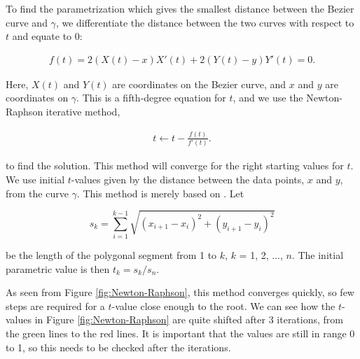 \documentclass[10pt]{article}
\begin{document}
To find the parametrization which gives the smallest distance between the Bezier curve and $\gamma$, we differentiate the distance between the two curves with respect to $t$ and equate to 0:

\begin{align}
f(t) =  2(X(t)-x)X'(t) + 2(Y(t)-y)Y'(t) = 0.
\end{align}

Here, $X(t)$ and $Y(t)$ are coordinates on the Bezier curve, and $x$ and $y$ are coordinates on $\gamma$. This is a fifth-degree equation for $t$, and we use the Newton-Raphson iterative method,

\begin{align}
t \gets t - \frac{f(t)}{f'(t)}.
\end{align}

to find the solution. This method will converge for the right starting values for $t$. We use initial $t$-values given by the distance between the data points, $x$ and $y$, from the curve $\gamma$. This method is merely based on \cite{Plass:1983}. Let

\begin{equation}
s_k = \sum_{i=1}^{k-1} \sqrt{(x_{i+1}-x_i)^2 + (y_{i+1}-y_i)^2}
\end{equation}

be the length of the polygonal segment from 1 to $k$, $k$ = 1, 2, ..., $n$. The initial parametric value is then $t_k = s_k/s_n$.

As seen from Figure \ref{fig:Newton-Raphson}, this method converges quickly, so few steps are required for a $t$-value close enough to the root. We can see how the $t$-values in Figure \ref{fig:Newton-Raphson} are quite shifted after 3 iterations, from the green lines to the red lines. It is important that the values are still in range 0 to 1, so this needs to be checked after the iterations. 
\end{document}
